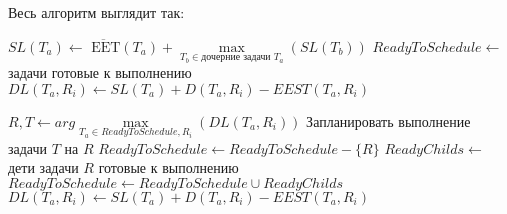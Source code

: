 \begin{spacing}{1.5}
Весь алгоритм выглядит так:
\begin{algorithmic}
\STATE $SL(T_a) \leftarrow \overline{\mbox{ EET}}(T_a) + \max\limits_{T_b \in \text{дочерние задачи $T_a$}}(SL (T_b))$
\ENDFOR
\STATE $ReadyToSchedule \leftarrow$ задачи готовые к выполнению
\STATE $DL(T_a, R_i) \leftarrow SL(T_a) + D(T_a, R_i) - EEST(T_a, R_i)$
\ENDFOR
\ENDFOR

\STATE $R, T \leftarrow arg\max\limits_{T_a \in ReadyToSchedule, R_i} (DL(T_a, R_i))$
\STATE Запланировать выполнение задачи $T$ на $R$
\STATE$ReadyToSchedule \leftarrow ReadyToSchedule - \{R\} $
\STATE $ReadyChilds \leftarrow$  дети задачи $R$ готовые к выполнению
\STATE$ReadyToSchedule \leftarrow ReadyToSchedule \cup ReadyChilds $
\STATE $DL(T_a, R_i) \leftarrow SL(T_a) + D(T_a, R_i) - EEST(T_a, R_i)$
\ENDFOR
\ENDFOR
\ENDWHILE
\end{algorithmic}


\end{spacing}